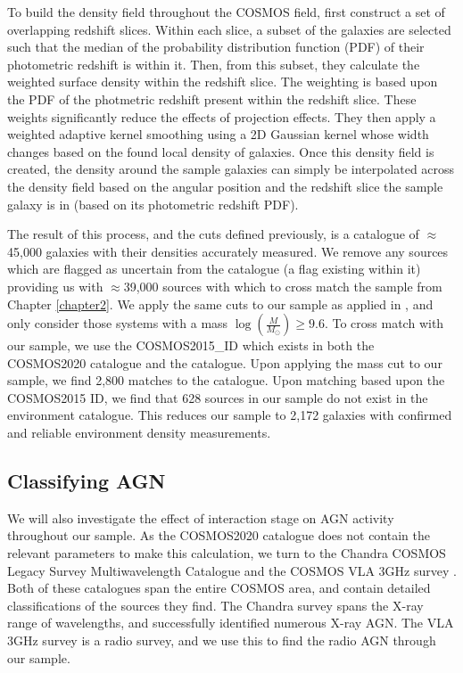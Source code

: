 To build the density field throughout the COSMOS field, \citet{2017ApJ...837...16D} first construct a set of overlapping redshift slices. Within each slice, a subset of the galaxies are selected such that the median of the probability distribution function (PDF) of their photometric redshift is within it. Then, from this subset, they calculate the weighted surface density within the redshift slice. The weighting is based upon the PDF of the photmetric redshift present within the redshift slice. These weights significantly reduce the effects of projection effects. They then apply a weighted adaptive kernel smoothing using a 2D Gaussian kernel whose width changes based on the found local density of galaxies. Once this density field is created, the density around the sample galaxies can simply be interpolated across the density field based on the angular position and the redshift slice the sample galaxy is in (based on its photometric redshift PDF).

The result of this process, and the cuts defined previously, is a catalogue of $\approx$45,000 galaxies with their densities accurately measured. We remove any sources which are flagged as uncertain from the catalogue (a flag existing within it) providing us with $\approx$39,000 sources with which to cross match the sample from Chapter \ref{chapter2}. We apply the same cuts to our sample as applied in \citet{2017ApJ...837...16D}, and only consider those systems with a mass $\log(\frac{M}{M_\odot}) \geq 9.6$. To cross match with our sample, we use the COSMOS2015\_ID which exists in both the COSMOS2020 catalogue and the \citet{2017ApJ...837...16D} catalogue. Upon applying the mass cut to our sample, we find 2,800 matches to the \citet{2017ApJ...837...16D} catalogue. Upon matching based upon the COSMOS2015 ID, we find that 628 sources in our sample do not exist in the environment catalogue. This reduces our sample to 2,172 galaxies with confirmed and reliable environment density measurements.

\subsection{Classifying AGN}\label{sec:agn-clsf}
\noindent We will also investigate the effect of interaction stage on AGN activity throughout our sample. As the COSMOS2020 catalogue does not contain the relevant parameters to make this calculation, we turn to the Chandra COSMOS Legacy Survey Multiwavelength Catalogue \citep{2016ApJ...817...34M} and the COSMOS VLA 3GHz survey \citep{2017A&A...602A...6S, 2017A&A...602A...3D}. Both of these catalogues span the entire COSMOS area, and contain detailed classifications of the sources they find. The Chandra survey spans the X-ray range of wavelengths, and successfully identified numerous X-ray AGN. The VLA 3GHz survey is a radio survey, and we use this to find the radio AGN through our sample. 

